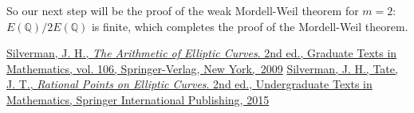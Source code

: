 \documentclass[11pt]{article}
\newcommand{\<}{\langle}
\renewcommand{\>}{\rangle}
\numberwithin{equation}{section}
\theoremstyle{plain}
\theoremstyle{definition}
\begin{document}
So our next step will be the proof of the weak Mordell-Weil theorem for \(m=2\): \(E(\mathbb{Q})/2E(\mathbb{Q})\) is finite, which completes the proof of the Mordell-Weil theorem.

\begin{thebibliography}{}

\bibitem{}
 \href{https://www.springer.com/la/book/9780387094939}{Silverman, J. H.,
 \emph{The Arithmetic of Elliptic Curves}. 2nd ed.,
 Graduate Texts in Mathematics, vol. 106, Springer-Verlag, New York,~2009}
\bibitem{}
 \href{https://books.google.co.kr/books?id=2_PLCQAAQBAJ&printsec=frontcover&dq=Rational+Points+on+Elliptic+Curves&hl=ko&sa=X&ved=0ahUKEwiahcaz_ZDhAhWUxIsBHfEdBtUQ6AEIMTAB#v=onepage&q=Rational%20Points%20on%20Elliptic%20Curves&f=false}{Silverman, J. H., Tate, J. T.,
 \emph{Rational Points on Elliptic Curves}. 2nd ed., Undergraduate Texts in Mathematics, Springer International Publishing, 2015}
\end{thebibliography}
\end{document}

